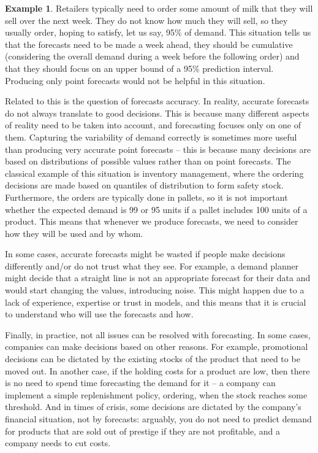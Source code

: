 \documentclass[
]{book}
\theoremstyle{definition}
\theoremstyle{definition}
\newtheorem{example}{Example}[chapter]
\theoremstyle{definition}
\theoremstyle{definition}
\theoremstyle{remark}
\begin{document}
\begin{example}
Retailers typically need to order some amount of milk that they will sell over the next week. They do not know how much they will sell, so they usually order, hoping to satisfy, let us say, 95\% of demand. This situation tells us that the forecasts need to be made a week ahead, they should be cumulative (considering the overall demand during a week before the following order) and that they should focus on an upper bound of a 95\% prediction interval. Producing only point forecasts would not be helpful in this situation.
\end{example}

Related to this is the question of forecasts accuracy. In reality, accurate forecasts do not always translate to good decisions. This is because many different aspects of reality need to be taken into account, and forecasting focuses only on one of them. Capturing the variability of demand correctly is sometimes more useful than producing very accurate point forecasts -- this is because many decisions are based on distributions of possible values rather than on point forecasts. The classical example of this situation is inventory management, where the ordering decisions are made based on quantiles of distribution to form safety stock. Furthermore, the orders are typically done in pallets, so it is not important whether the expected demand is 99 or 95 units if a pallet includes 100 units of a product. This means that whenever we produce forecasts, we need to consider how they will be used and by whom.

In some cases, accurate forecasts might be wasted if people make decisions differently and/or do not trust what they see. For example, a demand planner might decide that a straight line is not an appropriate forecast for their data and would start changing the values, introducing noise. This might happen due to a lack of experience, expertise or trust in models, and this means that it is crucial to understand who will use the forecasts and how.

Finally, in practice, not all issues can be resolved with forecasting. In some cases, companies can make decisions based on other reasons. For example, promotional decisions can be dictated by the existing stocks of the product that need to be moved out. In another case, if the holding costs for a product are low, then there is no need to spend time forecasting the demand for it -- a company can implement a simple replenishment policy, ordering, when the stock reaches some threshold. And in times of crisis, some decisions are dictated by the company's financial situation, not by forecasts: arguably, you do not need to predict demand for products that are sold out of prestige if they are not profitable, and a company needs to cut costs.
\end{document}
